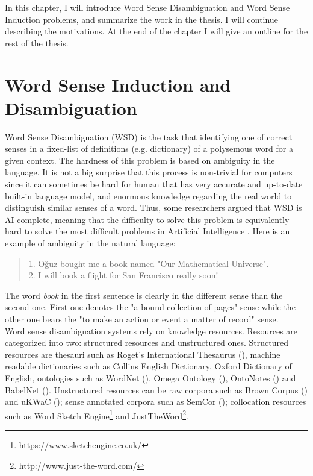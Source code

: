 In this chapter, I will introduce Word Sense Disambiguation and Word Sense Induction problems, and summarize the work in the thesis. I will continue describing the motivations. At the end of the chapter I will give an outline for the rest of the thesis.

\section{Word Sense Induction and Disambiguation}

Word Sense Disambiguation (WSD) is the task that identifying one of correct senses in a fixed-list of definitions (e.g. dictionary) of a polysemous word for a given context. The hardness of this problem is based on ambiguity in the language. It is not a big surprise that this process is non-trivial for computers since it can sometimes be hard for human that has very accurate and up-to-date built-in language model, and enormous knowledge regarding the real world to distinguish similar senses of a word. Thus, some researchers argued that WSD is AI-complete, meaning that the difficulty to solve this problem is equivalently hard to solve the most difficult problems in Artificial Intelligence \cite{mallery1988thinking}. Here is an example of ambiguity in the natural language: \\

\begin{quote}
1. Oğuz bought me a book named "Our Mathematical Universe".\\ 2. I will book a flight for San Francisco really soon!
\end{quote}


The word \emph{book} in the first sentence is clearly in the different sense than the second one. First one denotes the "a bound collection of pages" sense while the other one bears the "to make an action or event a matter of record" sense. \\

Word sense disambiguation systems rely on knowledge resources. Resources are categorized into two: structured resources and unstructured ones. Structured resources are thesauri such as Roget's International Thesaurus (\cite{chapman1984roget}), machine readable dictionaries such as Collins English Dictionary, Oxford Dictionary of English, ontologies such as WordNet (\cite{fellbaum98electronic}), Omega Ontology (\cite{philpot2005omega}), OntoNotes (\cite{hovy06ontonotes}) and BabelNet (\cite{navigli2012babelnet}). Unstructured resources can be raw corpora such as Brown Corpus (\cite{francis1979brown}) and uKWaC (\cite{ukWaC}); sense annotated corpora such as SemCor (\cite{mihalcea1998semcor}); collocation resources such as Word Sketch Engine\footnote{https://www.sketchengine.co.uk/} and JustTheWord\footnote{http://www.just-the-word.com/}. \\

